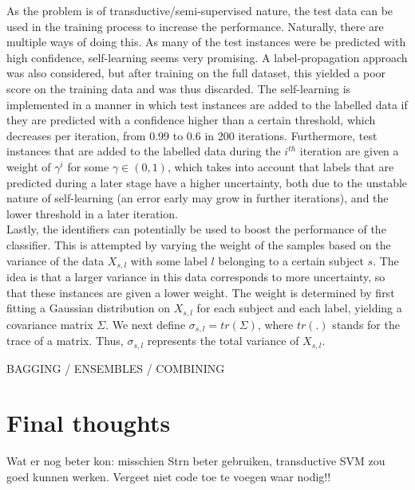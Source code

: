 \documentclass [a4paper] {report}
\begin{document}
	\noindent
	As the problem is of transductive/semi-supervised nature, the test data can be used in the training process to increase the performance. Naturally, there are multiple ways of doing this. As many of the test instances were be predicted with high confidence, self-learning  seems very promising. A label-propagation approach was also considered, but after training on the full dataset, this yielded a poor score on the training data and was thus discarded. The self-learning is implemented in a manner in which test instances are added to the labelled data if they are predicted with a confidence higher than a certain threshold, which decreases per iteration, from 0.99 to 0.6 in 200 iterations. Furthermore, test instances that are added to the labelled data during the $i^{th}$ iteration are given a weight of $\gamma^{i}$ for some $\gamma \in (0,1)$, which takes into account that labels that are predicted during a later stage have a higher uncertainty, both due to the unstable nature of self-learning (an error early may grow in further iterations), and the lower threshold in a later iteration.\\
	
	\noindent
	Lastly, the identifiers can potentially be used to boost the performance of the classifier. This is attempted by varying the weight of the samples based on the variance of the data $X_{s,l}$ with some label $l$ belonging to a certain subject $s$. The idea is that a larger variance in this data corresponds to more uncertainty, so that these instances are given a lower weight. The weight is determined by first fitting a Gaussian distribution on $X_{s,l}$ for each subject and each label, yielding a covariance matrix $\Sigma$. We next define $\sigma_{s,l} = tr(\Sigma)$, where $tr(.)$ stands for the trace of a matrix. Thus, $\sigma_{s,l}$ represents the total variance of $X_{s,l}$.
	
	
	
	
	\noindent
	BAGGING / ENSEMBLES / COMBINING
	
	\section*{Final thoughts}
	Wat er nog beter kon: misschien Strn beter gebruiken, transductive SVM zou goed kunnen werken.
	Vergeet niet code toe te voegen waar nodig!!
	
	
\end{document}
